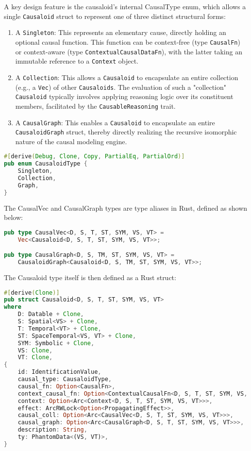 A key design feature is the causaloid's internal CausalType enum, which allows a single \texttt{Causaloid} struct to represent one of three distinct structural forms:
\begin{enumerate}
    \item A \texttt{Singleton}: This represents an elementary cause, directly holding an optional causal function. This function can be context-free (type \texttt{CausalFn}) or context-aware (type \texttt{ContextualCausalDataFn}), with the latter taking an immutable reference to a \texttt{Context} object.
    \item A \texttt{Collection}: This allows a \texttt{Causaloid} to encapsulate an entire collection (e.g., a \texttt{Vec}) of other \texttt{Causaloids}. The evaluation of such a "collection" \texttt{Causaloid} typically involves applying reasoning logic over its constituent members, facilitated by the \texttt{CausableReasoning} trait.
    \item A \texttt{CausalGraph}: This enables a \texttt{Causaloid} to encapsulate an entire \texttt{CausaloidGraph} struct, thereby directly realizing the recursive isomorphic nature of the causal modeling engine.
\end{enumerate}

\begin{lstlisting}[language=Rust, label={list:CausalType}, caption={The Causal CausaloidType Enum}]
#[derive(Debug, Clone, Copy, PartialEq, PartialOrd)]
pub enum CausaloidType {
    Singleton,
    Collection,
    Graph,
}
\end{lstlisting}

The CausalVec and CausalGraph types are type aliases in Rust, defined as shown below:

\begin{lstlisting}[language=Rust, label={list:CausalTypeAliase}, caption={The Causal Vec and Graph Type Alias}]
pub type CausalVec<D, S, T, ST, SYM, VS, VT> = 
	Vec<Causaloid<D, S, T, ST, SYM, VS, VT>>;

pub type CausalGraph<D, S, TM, ST, SYM, VS, VT> =
    CausaloidGraph<Causaloid<D, S, TM, ST, SYM, VS, VT>>;
\end{lstlisting}

\newpage

The Causaloid type itself is then defined as a Rust struct:

\begin{lstlisting}[language=Rust, label={list:CausaloidType}, caption={The Causaloid Type}]
#[derive(Clone)]
pub struct Causaloid<D, S, T, ST, SYM, VS, VT>
where
    D: Datable + Clone,
    S: Spatial<VS> + Clone,
    T: Temporal<VT> + Clone,
    ST: SpaceTemporal<VS, VT> + Clone,
    SYM: Symbolic + Clone,
    VS: Clone,
    VT: Clone,
{
    id: IdentificationValue,
    causal_type: CausaloidType,
    causal_fn: Option<CausalFn>,
    context_causal_fn: Option<ContextualCausalFn<D, S, T, ST, SYM, VS, VT>>,
    context: Option<Arc<Context<D, S, T, ST, SYM, VS, VT>>>,
    effect: ArcRWLock<Option<PropagatingEffect>>,
    causal_coll: Option<Arc<CausalVec<D, S, T, ST, SYM, VS, VT>>>,
    causal_graph: Option<Arc<CausalGraph<D, S, T, ST, SYM, VS, VT>>>,
    description: String,
    ty: PhantomData<(VS, VT)>,
}
\end{lstlisting}

